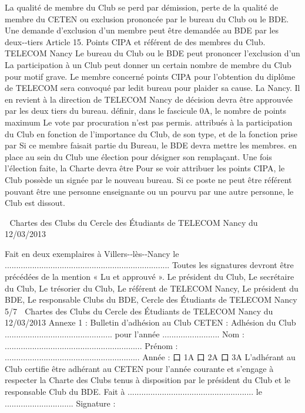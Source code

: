 \documentclass{article} %
\begin{document}
\begin{multicols}{2}
La  qualité  de  membre  du  Club  se  perd  par  démission,  perte   de  la  qualité  de  membre  du  CETEN  ou  exclusion  prononcée   par  le  bureau  du  Club  ou  le  BDE.  Une  demande  d’exclusion   d’un  membre  peut  être  demandée  au  BDE  par  les  deux-­‐tiers  
Article  15. Points   CIPA   et   référent   de  
des  membres  du  Club.  
TELECOM  Nancy  
Le  bureau  du  Club  ou  le  BDE  peut  prononcer  l’exclusion  d’un   La  participation  à  un  Club  peut  donner  un  certain  nombre  de  
membre   du   Club   pour   motif   grave.   Le   membre   concerné   points   CIPA   pour   l’obtention   du   diplôme   de   TELECOM  
sera   convoqué   par   ledit   bureau   pour   plaider   sa   cause.   La   Nancy.   Il   en   revient   à   la   direction   de   TELECOM   Nancy   de  
décision  devra  être  approuvée  par  les  deux  tiers  du  bureau.   définir,  dans  le  fascicule  0A,  le  nombre  de  points  maximum  
Le  vote  par  procuration  n’est  pas  permis.   attribués   à   la   participation   du   Club   en   fonction   de   l’importance  du  Club,  de  son  type,  et  de  la  fonction  prise  par  
Si  ce  membre  faisait  partie  du  Bureau,  le  BDE  devra  mettre  
les  membres.  
en   place   au   sein   du   Club   une   élection   pour   désigner   son   remplaçant.   Une   fois   l’élection   faite,   la   Charte   devra   être   Pour   se   voir   attribuer   les   points   CIPA,   le   Club   possède   un  
signée   par   le   nouveau   bureau.   Si   ce   poste   ne   peut   être   référent   pouvant   être   une   personne   enseignante   ou   un  
pourvu   par   une   autre   personne,   le   Club   est   dissout.
     

Chartes  des  Clubs  du  Cercle  des  Étudiants  de  TELECOM  Nancy  du  12/03/2013  
  
Fait  en  deux  exemplaires  à  Villers-­‐lès-­‐Nancy  le  ........................................................................  
Toutes  les  signatures  devront  être  précédées  de  la  mention  «  Lu  et  approuvé  ».  
Le  président  du  Club,   Le  secrétaire  du  Club,  
Le  trésorier  du  Club,   Le  référent  de  TELECOM  Nancy,  
Le  président  du  BDE,   Le  responsable  Clubs  du  BDE,        
                  Cercle  des  Étudiants  de  TELECOM  Nancy   5/7  

Chartes  des  Clubs  du  Cercle  des  Étudiants  de  TELECOM  Nancy  du  12/03/2013  
Annexe  1  :  Bulletin  d’adhésion  au  Club     
CETEN  :  Adhésion  du  Club  ...............................................  pour  l’année  .........................  
Nom  :  ............................................................  Prénom  :  ...........................................................    Année  :  口  1A  口  2A  口  3A  
L’adhérant  au  Club  certifie  être  adhérant  au  CETEN  pour  l’année  courante  et  s’engage  à  respecter  la  Charte  des  Clubs   tenus  à  disposition  par  le  président  du  Club  et  le  responsable  Club  du  BDE.  
Fait  à  .......................................................  le  ..............................            Signature  :  
  

\end{multicols}
\end{document}
